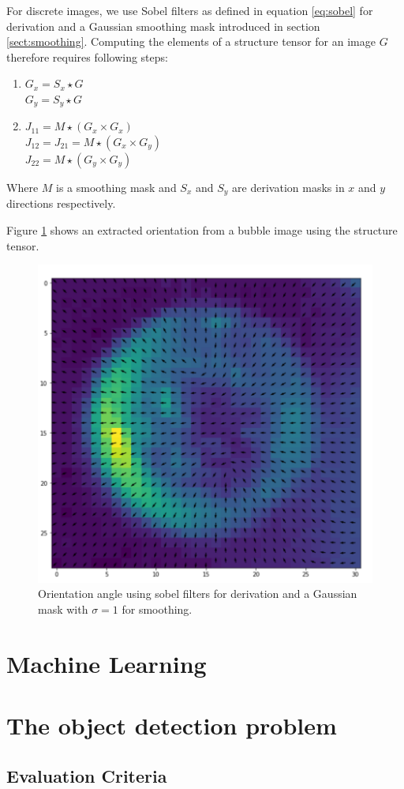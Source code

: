 		For discrete images, we use Sobel filters as defined in equation \ref{eq:sobel} for derivation and a Gaussian smoothing mask introduced in section \ref{sect:smoothing}. Computing the elements of a structure tensor for an image $G$ therefore requires following steps:
		\begin{enumerate}
			\item $G_x = S_x \star G$ \\
						$G_y = S_y \star G$
			\item $J_{11} = M \star (G_x \times G_x)$ \\
						 $J_{12} = J_{21} = M \star (G_x \times G_y)$ \\
						 $J_{22} = M \star (G_y \times G_y)$
		\end{enumerate}
		Where $M$ is a smoothing mask and $S_x$ and $S_y$ are derivation masks in $x$ and $y$ directions respectively.

		Figure \ref{fig:struct_tensor_demo} shows an extracted orientation from a bubble image using the structure tensor.
		\begin{figure}
			\centering
			\includegraphics[scale=0.4]{images/structure_tensor_demo.png}
			\caption{Orientation angle using sobel filters for derivation and a Gaussian mask with $\sigma =1$ for smoothing.}
			\label{fig:struct_tensor_demo}
		\end{figure}
		
	
	\section{Machine Learning}
	\label{machine_learning}
	
	\section{The object detection problem}
	\label{the_object_detection_problem}
		\subsection{Evaluation Criteria}
